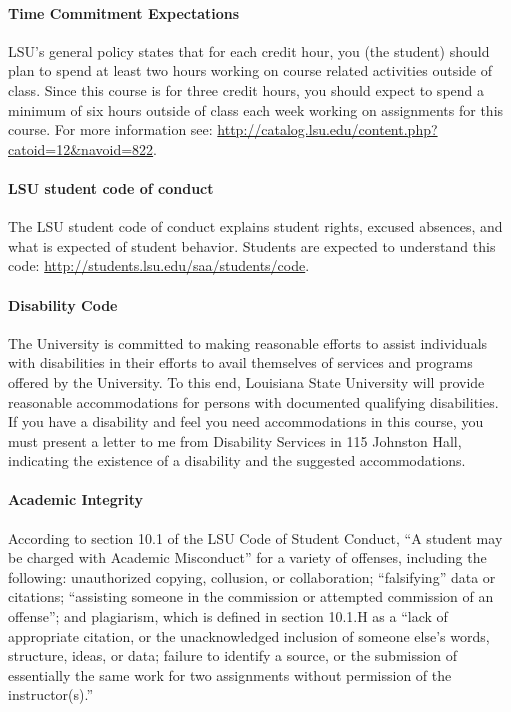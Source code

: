 \documentclass[11pt,article,oneside]{memoir}
\begin{document}
\paragraph{Time Commitment Expectations}
LSU's general policy states that for each credit hour, 
you (the student) should plan to
spend at least two hours working 
on course related activities outside of class. 
Since this course is for three credit hours, 
you should expect to spend a minimum of six hours 
outside of class each week 
working on assignments for this course. 
For more information see: 
\url{http://catalog.lsu.edu/content.php?catoid=12&navoid=822}.

\paragraph{LSU student code of conduct}
The LSU student code of conduct explains 
student rights, excused absences, 
and what is expected of student behavior. 
Students are expected to understand this code:  
\url{http://students.lsu.edu/saa/students/code}.

\paragraph{Disability Code}
The University is committed to making reasonable efforts 
to assist individuals with disabilities in
their efforts to avail themselves of 
services and programs offered by the University. 
To this end, Louisiana State University will provide 
reasonable accommodations for persons
with documented qualifying disabilities.
 If you have a disability and 
 feel you need accommodations in this course, 
 you must present a letter to me 
 from Disability Services in 115 Johnston Hall,
indicating the existence of a disability 
and the suggested accommodations.

\paragraph{Academic Integrity}
According to section 10.1 
of the LSU Code of Student Conduct, 
``A student may be charged with Academic Misconduct'' 
for a variety of offenses, including the following: 
unauthorized copying, collusion, or collaboration; 
``falsifying'' data or citations; 
``assisting someone in the commission 
or attempted commission of an offense''; 
and plagiarism, which is defined in section 10.1.H as a 
``lack of appropriate citation, 
or the unacknowledged inclusion 
of someone else's words, structure, ideas, or data; 
failure to identify a source, 
or the submission of essentially the same work 
for two assignments 
without permission of the instructor(s).''
\end{document}

